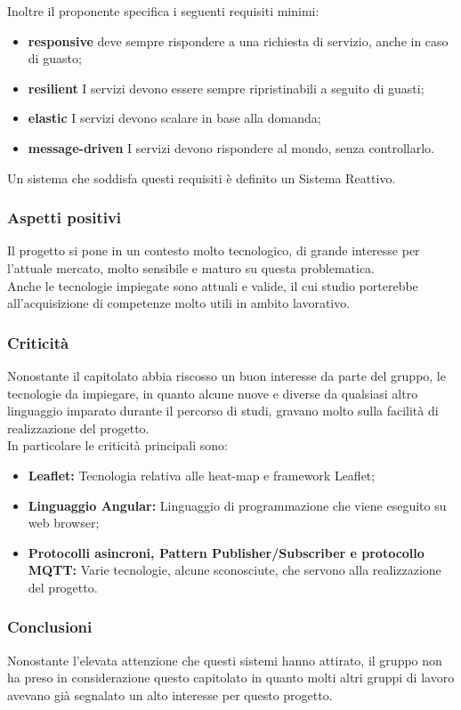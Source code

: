 Inoltre il proponente specifica i seguenti requisiti minimi:
\begin{itemize}
	\item \textbf{responsive} deve sempre rispondere a una richiesta di servizio, anche in caso di guasto;
	\item \textbf{resilient} I servizi devono essere sempre ripristinabili a seguito di guasti;
	\item \textbf{elastic} I servizi devono scalare in base alla domanda;
	\item \textbf{message-driven} I servizi devono rispondere al mondo, senza controllarlo.
\end{itemize}
Un sistema che soddisfa questi requisiti è definito un Sistema Reattivo.


\subsubsection{Aspetti positivi}

Il progetto si pone in un contesto molto tecnologico, di grande interesse per l'attuale mercato, molto sensibile e maturo su questa problematica.\\
Anche le tecnologie impiegate sono attuali e valide, il cui studio porterebbe all'acquisizione di competenze molto utili in ambito lavorativo.



\subsubsection{Criticità}

Nonostante il capitolato abbia riscosso un buon interesse da parte del gruppo, le tecnologie da impiegare, in quanto alcune nuove e diverse da qualsiasi altro linguaggio imparato durante il percorso di studi, gravano molto sulla facilità di realizzazione del progetto.\\
In particolare le criticità principali sono:
\begin{itemize}
    \item \textbf{Leaflet:} Tecnologia relativa alle heat-map e framework Leaflet;
    \item \textbf{Linguaggio Angular:} Linguaggio di programmazione che viene eseguito su web browser;
    \item \textbf{Protocolli asincroni, Pattern Publisher/Subscriber e protocollo MQTT: } Varie tecnologie, alcune sconosciute, che servono alla realizzazione del progetto.
\end{itemize}


\subsubsection{Conclusioni}

Nonostante l'elevata attenzione che questi sistemi hanno attirato, il gruppo non ha preso in considerazione questo capitolato in quanto molti altri gruppi di lavoro avevano già segnalato un alto interesse per questo progetto. \\
